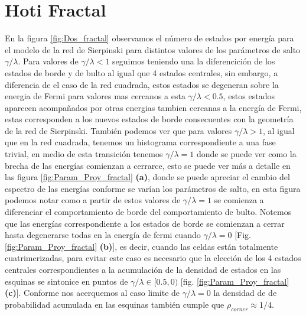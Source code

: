 \newpage


\section{Hoti Fractal}




En la figura \ref{fig:Dos_fractal} observamos el número de estados por energía para el modelo de la red de Sierpinski para distintos valores de los parámetros de salto $\gamma/\lambda$. Para valores de $\gamma/\lambda < 1$ seguimos teniendo una la diferencición de los estados de borde y de bulto al igual que 4 estados centrales, sin embargo, a diferencia de el caso de la red cuadrada, estos estados se degeneran sobre la energia de Fermi para valores mas cercanos a esta  $\gamma/\lambda < 0.5$, estos estados aparecen acompañados por otras energias tambien cercanas a la energía de Fermi, estas corresponden a los nuevos estados de borde consecuentes con la geometría de la red de Sierpinski. También podemos ver que para valores $\gamma/\lambda > 1$, al igual que en la red cuadrada, tenemos un histograma correspondiente a una fase trivial, en medio de esta transición tenemos $\gamma/\lambda = 1$ donde se puede ver como la brecha de las energías comienzan a cerrarce, esto se puede ver más a detalle en las figura \ref{fig:Param_Proy_fractal} \textbf{(a)}, donde se puede apreciar el cambio del espectro de las energías conforme se varían los parámetros de salto, en esta figura podemos notar como a partir de estos valores de $\gamma/\lambda = 1$ se comienza a diferenciar el comportamiento de borde del comportamiento de bulto. Notemos que las energías correspondiente a los estados de borde se comienzan a cerrar hasta degenerarse todas en la energía de fermi cuando $\gamma/\lambda = 0$ [Fig. \ref{fig:Param_Proy_fractal} \textbf{(b)}], es decir, cuando las celdas están totalmente cuatrimerizadas, para evitar este caso es necesario que la elección de los 4 estados centrales correspondientes a la acumulación de la densidad de estados en las esquinas se sintonice en puntos de $\gamma/\lambda \in [0.5,0)$ [fig. \ref{fig:Param_Proy_fractal} \textbf{(c)}]. Conforme nos acerquemos al caso limite de $\gamma/\lambda = 0$ la densidad de de probabilidad acumulada en las esquinas también cumple que $\rho_{corner} \approx 1/4$.




